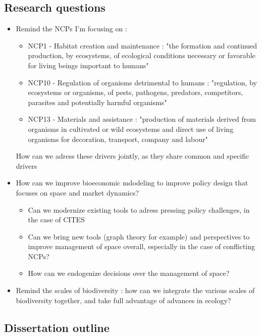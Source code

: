 \subsection*{Research questions}

\begin{itemize}
\item Remind the NCPs I'm focusing on :
\begin{itemize}
\item NCP1 - Habitat creation and maintenance : "the formation and continued production, by ecosystems, of ecological conditions necessary or favorable for living beings important to humans"
\item NCP10 - Regulation of organisms detrimental to humans : "regulation, by ecosystems or organisms, of pests, pathogens, predators, competitors, parasites and potentially harmful organisms"
\item NCP13 - Materials and assistance : "production of materials derived from organisms in cultivated or wild ecosystems and direct use of living organisms for decoration, transport, company and labour"
\end{itemize}
 
How can we adress these drivers jointly, as they share common and specific drivers
\item How can we improve bioeconomic mdodeling to improve policy design that focuses on space and market dynamics? 
\begin{itemize}
\item Can we modernize existing tools to adress pressing policy challenges, in the case of CITES
\item Can we bring new tools (graph theory for example) and perspectives to improve management of space overall, especially in the case of conflicting NCPs? 
\item How can we endogenize decisions over the management of space? 
\end{itemize}
\item Remind the scales of biodiversity : how can we integrate the various scales of biodiversity together, and take full advantage of advances in ecology? 
\end{itemize}

\subsection*{Dissertation outline}
